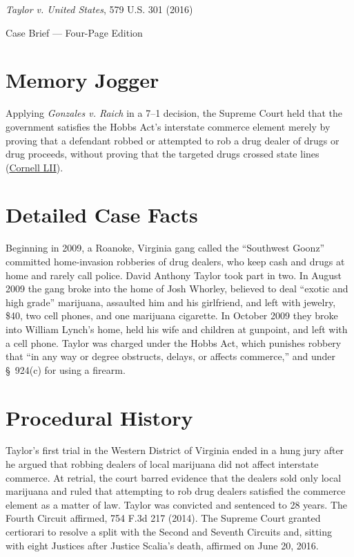 \documentclass[12pt]{article}
\begin{document}
\begin{center}
{\LARGE \textit{Taylor v. United States}, 579 U.S. 301 (2016)\par}
\vspace{0.8em}
{\large Case Brief --- Four-Page Edition\par}
\end{center}
\vspace{1em}

\section{Memory Jogger}

Applying \textit{Gonzales v. Raich} in a 7--1 decision, the Supreme Court held that the government satisfies the Hobbs Act's interstate commerce element merely by proving that a defendant robbed or attempted to rob a drug dealer of drugs or drug proceeds, without proving that the targeted drugs crossed state lines (\href{https://www.law.cornell.edu/supremecourt/text/14-6166}{Cornell LII}).

\section{Detailed Case Facts}

Beginning in 2009, a Roanoke, Virginia gang called the ``Southwest Goonz'' committed home-invasion robberies of drug dealers, who keep cash and drugs at home and rarely call police. David Anthony Taylor took part in two. In August 2009 the gang broke into the home of Josh Whorley, believed to deal ``exotic and high grade'' marijuana, assaulted him and his girlfriend, and left with jewelry, \$40, two cell phones, and one marijuana cigarette. In October 2009 they broke into William Lynch's home, held his wife and children at gunpoint, and left with a cell phone. Taylor was charged under the Hobbs Act, which punishes robbery that ``in any way or degree obstructs, delays, or affects commerce,'' and under \S~924(c) for using a firearm.

\section{Procedural History}

Taylor's first trial in the Western District of Virginia ended in a hung jury after he argued that robbing dealers of local marijuana did not affect interstate commerce. At retrial, the court barred evidence that the dealers sold only local marijuana and ruled that attempting to rob drug dealers satisfied the commerce element as a matter of law. Taylor was convicted and sentenced to 28 years. The Fourth Circuit affirmed, 754 F.3d 217 (2014). The Supreme Court granted certiorari to resolve a split with the Second and Seventh Circuits and, sitting with eight Justices after Justice Scalia's death, affirmed on June 20, 2016.
\end{document}
